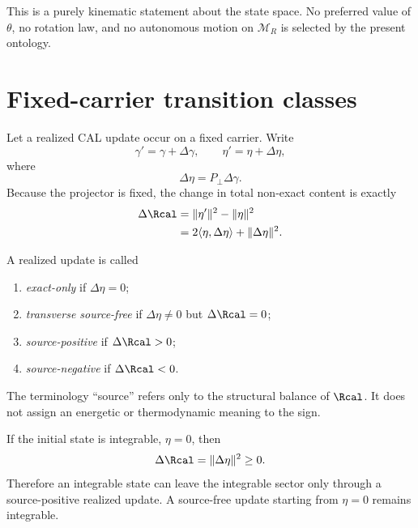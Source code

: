 This is a purely kinematic statement about the state space. No preferred value of $\theta$, no rotation law, and no autonomous motion on $\mathcal M_R$ is selected by the present ontology.

\section{Fixed-carrier transition classes}
\label{sec:fixed}

Let a realized CAL update occur on a fixed carrier. Write
\begin{equation}
\gamma' = \gamma+\Delta\gamma,
\qquad
\eta' = \eta+\Delta\eta,
\end{equation}
where
\begin{equation}
\Delta\eta=P_\perp\Delta\gamma.
\label{eq:delta-eta}
\end{equation}
Because the projector is fixed, the change in total non-exact content is exactly
\begin{align}
\Delta\Rcal
&=\lVert\eta'\rVert^2-\lVert\eta\rVert^2 \\
&=2\langle\eta,\Delta\eta\rangle+\lVert\Delta\eta\rVert^2.
\label{eq:fixed-transition-law}
\end{align}

\begin{definition}
A realized update is called
\begin{enumerate}
\item \emph{exact-only} if $\Delta\eta=0$;
\item \emph{transverse source-free} if $\Delta\eta\neq0$ but $\Delta\Rcal=0$;
\item \emph{source-positive} if $\Delta\Rcal>0$;
\item \emph{source-negative} if $\Delta\Rcal<0$.
\end{enumerate}
\end{definition}

The terminology ``source'' refers only to the structural balance of $\Rcal$. It does not assign an energetic or thermodynamic meaning to the sign.

\begin{proposition}
\label{prop:integrable-origin-positive}
If the initial state is integrable, $\eta=0$, then
\begin{equation}
\Delta\Rcal=\lVert\Delta\eta\rVert^2\ge0.
\label{eq:integrable-origin-law}
\end{equation}
Therefore an integrable state can leave the integrable sector only through a source-positive realized update. A source-free update starting from $\eta=0$ remains integrable.
\end{proposition}

